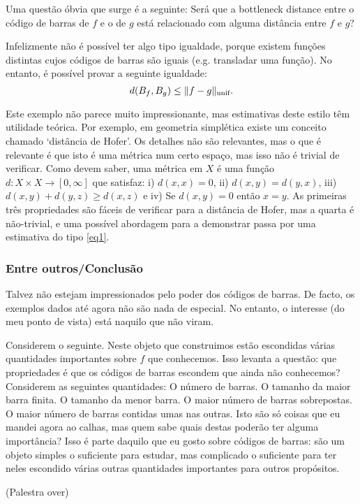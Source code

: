 \documentclass{article}
\theoremstyle{nonumberplain}
\DeclarePairedDelimiter{\Norm}{\lVert}{\rVert}
\begin{document}
Uma questão óbvia que surge é a seguinte: Será que a bottleneck distance entre o código de barras de $f$ e o de $g$ está relacionado com alguma distância entre $f$ e $g$?

Infelizmente não é possível ter algo tipo igualdade, porque existem funções distintas cujos códigos de barras são iguais (e.g. transladar uma função). No entanto, é possível provar a seguinte igualdade:
\begin{equation}\label{eq1}
d(B_f,B_g) \leq \Norm{f-g}_{\text{unif}}.
\end{equation}

Este exemplo não parece muito impressionante, mas estimativas deste estilo têm utilidade teórica. Por exemplo, em geometria simplética existe um conceito chamado `distância de Hofer'. Os detalhes não são relevantes, mas o que é relevante é que isto é uma métrica num certo espaço, mas isso não é trivial de verificar. Como devem saber, uma métrica em $X$ é uma função $d \colon X \times X \to [0,\infty]$ que satisfaz: i) $d(x,x) = 0$, ii) $d(x,y) = d(y,x)$, iii) $d(x,y) + d(y,z) \geq d(x,z)$ e iv) Se $d(x,y) = 0$ então $x=y$. As primeiras três propriedades são fáceis de verificar para a distância de Hofer, mas a quarta é não-trivial, e uma possível abordagem para a demonstrar passa por uma estimativa do tipo \eqref{eq1}.

\subsubsection{Entre outros/Conclusão}

Talvez não estejam impressionados pelo poder dos códigos de barras. De facto, os exemplos dados até agora não são nada de especial. No entanto, o interesse (do meu ponto de vista) está naquilo que não viram.

Considerem o seguinte. Neste objeto que construimos estão escondidas várias quantidades importantes sobre $f$ que conhecemos. Isso levanta a questão: que propriedades é que os códigos de barras escondem que ainda não conhecemos? Considerem as seguintes quantidades: O número de barras. O tamanho da maior barra finita. O tamanho da menor barra. O maior número de barras sobrepostas. O maior número de barras contidas umas nas outras. Isto são só coisas que eu mandei agora ao calhas, mas quem sabe quais destas poderão ter alguma importância? Isso é parte daquilo que eu gosto sobre códigos de barras: são um objeto simples o suficiente para estudar, mas complicado o suficiente para ter neles escondido várias outras quantidades importantes para outros propósitos.

(Palestra over)
\end{document}

